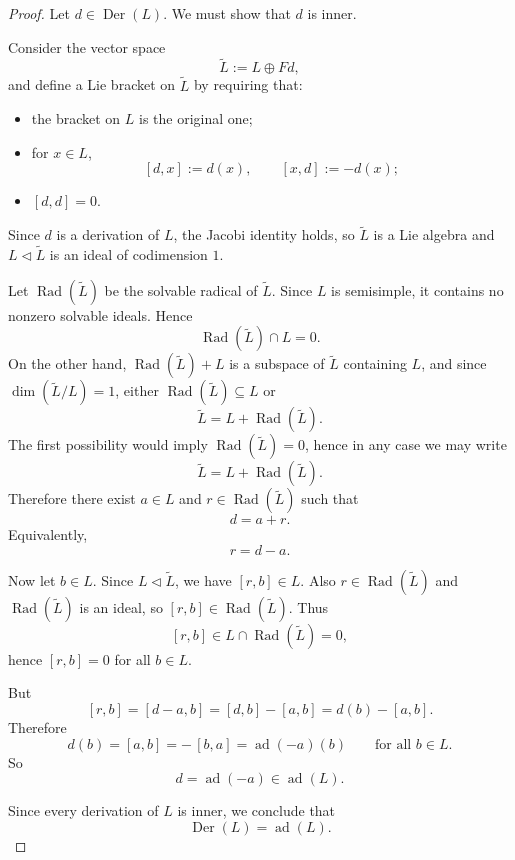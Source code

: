 \begin{proof}
    Let $d \in \operatorname{Der}(L)$. We must show that $d$ is inner.

    Consider the vector space
    \[
        \widetilde L := L \oplus Fd,
    \]
    and define a Lie bracket on $\widetilde L$ by requiring that:
    \begin{itemize}
        \item the bracket on $L$ is the original one;
        \item for $x \in L$,
              \[
                  [d,x]:=d(x), \qquad [x,d]:=-d(x);
              \]
        \item $[d,d]=0$.
    \end{itemize}
    Since $d$ is a derivation of $L$, the Jacobi identity holds, so $\widetilde L$
    is a Lie algebra and $L \triangleleft \widetilde L$ is an ideal of codimension $1$.

    Let $\operatorname{Rad}(\widetilde L)$ be the solvable radical of $\widetilde L$.
    Since $L$ is semisimple, it contains no nonzero solvable ideals. Hence
    \[
        \operatorname{Rad}(\widetilde L)\cap L=0.
    \]
    On the other hand, $\operatorname{Rad}(\widetilde L)+L$ is a subspace of
    $\widetilde L$ containing $L$, and since $\dim(\widetilde L/L)=1$, either
    $\operatorname{Rad}(\widetilde L)\subseteq L$ or
    \[
        \widetilde L=L+\operatorname{Rad}(\widetilde L).
    \]
    The first possibility would imply $\operatorname{Rad}(\widetilde L)=0$, hence in any case
    we may write
    \[
        \widetilde L=L+\operatorname{Rad}(\widetilde L).
    \]
    Therefore there exist $a\in L$ and $r\in \operatorname{Rad}(\widetilde L)$ such that
    \[
        d=a+r.
    \]
    Equivalently,
    \[
        r=d-a.
    \]

    Now let $b\in L$. Since $L\triangleleft \widetilde L$, we have $[r,b]\in L$.
    Also $r\in \operatorname{Rad}(\widetilde L)$ and $\operatorname{Rad}(\widetilde L)$ is an ideal,
    so $[r,b]\in \operatorname{Rad}(\widetilde L)$. Thus
    \[
        [r,b]\in L\cap \operatorname{Rad}(\widetilde L)=0,
    \]
    hence $[r,b]=0$ for all $b\in L$.

    But
    \[
        [r,b]=[d-a,b]=[d,b]-[a,b]=d(b)-[a,b].
    \]
    Therefore
    \[
        d(b)=[a,b]=-\,[b,a]=\operatorname{ad}(-a)(b)
        \qquad \text{for all } b\in L.
    \]
    So
    \[
        d=\operatorname{ad}(-a)\in \operatorname{ad}(L).
    \]

    Since every derivation of $L$ is inner, we conclude that
    \[
        \operatorname{Der}(L)=\operatorname{ad}(L).
    \]
\end{proof}

